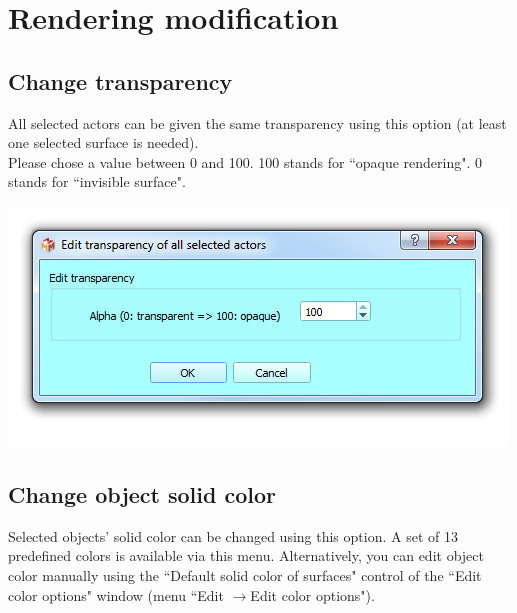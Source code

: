 \section{Rendering modification}



\subsection{Change transparency}
\noindent
\begin{minipage}{0.4\textwidth}
All selected actors can be given the same transparency using this option (at least one selected surface is needed).\\
Please chose a value between 0 and 100. 100 stands for ``opaque rendering". 0 stands for ``invisible surface".\\


\end{minipage}    
\begin{minipage}{0.6\textwidth}\centering
  \includegraphics[scale=0.5]{images/09/rendering/transparency.png}
 \end{minipage} 
\noindent





\subsection{Change object solid color}
Selected objects' solid color can be changed using this option. A set of 13 predefined colors is available via this menu. Alternatively, you can edit object color manually using the ``Default solid color of surfaces" control of the ``Edit color options" window (menu ``Edit $\rightarrow$Edit color options").


